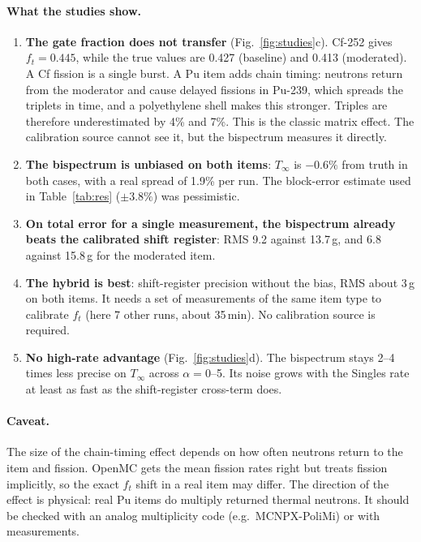 \documentclass[11pt,a4paper]{article}
\newcommand{\Tinf}{T_\infty}
\begin{document}
\paragraph{What the studies show.}
\begin{enumerate}
  \item \textbf{The gate fraction does not transfer} (Fig.~\ref{fig:studies}c). Cf-252 gives
        $f_t=0.445$, while the true values are 0.427 (baseline) and 0.413 (moderated). A Cf
        fission is a single burst. A Pu item adds chain timing: neutrons return from the
        moderator and cause delayed fissions in Pu-239, which spreads the triplets in time,
        and a polyethylene shell makes this stronger. Triples are therefore underestimated by
        4\% and 7\%. This is the classic matrix effect. The calibration source cannot see it,
        but the bispectrum measures it directly.
  \item \textbf{The bispectrum is unbiased on both items}: $\Tinf$ is $-0.6\%$ from truth in
        both cases, with a real spread of 1.9\% per run. The block-error estimate used in
        Table~\ref{tab:res} ($\pm3.8\%$) was pessimistic.
  \item \textbf{On total error for a single measurement, the bispectrum already beats the
        calibrated shift register}: RMS 9.2 against 13.7\,g, and 6.8 against 15.8\,g for the
        moderated item.
  \item \textbf{The hybrid is best}: shift-register precision without the bias, RMS about 3\,g
        on both items. It needs a set of measurements of the same item type to calibrate
        $f_t$ (here 7 other runs, about 35\,min). No calibration source is required.
  \item \textbf{No high-rate advantage} (Fig.~\ref{fig:studies}d). The bispectrum stays 2--4
        times less precise on $\Tinf$ across $\alpha=0$--5. Its noise grows with the
        Singles rate at least as fast as the shift-register cross-term does.
\end{enumerate}

\paragraph{Caveat.} The size of the chain-timing effect depends on how often neutrons
return to the item and fission. OpenMC gets the mean fission rates right but treats fission
implicitly, so the exact $f_t$ shift in a real item may differ. The direction of the effect
is physical: real Pu items do multiply returned thermal neutrons. It should be checked with
an analog multiplicity code (e.g.\ MCNPX-PoliMi) or with measurements.
\end{document}
